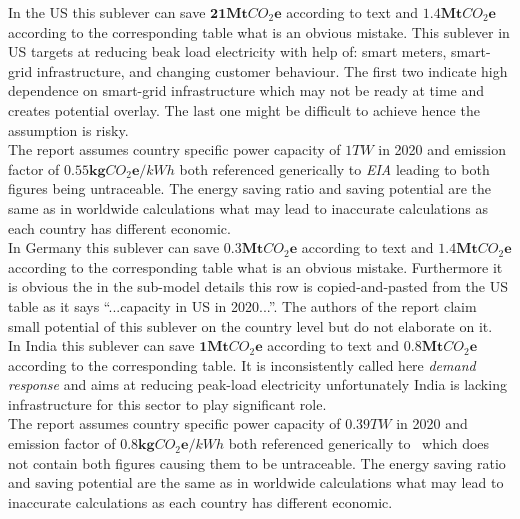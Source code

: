 \documentclass[11pt, twocolumn]{article}
\begin{document}
In the US this sublever can save $\mathbf{21} \mathbf{Mt}CO_2\mathbf{e}$ according to text and $\mathbf{1.4} \mathbf{Mt}CO_2\mathbf{e}$ according to the corresponding table what is an obvious mistake. This sublever in US targets at reducing beak load electricity with help of: smart meters, smart-grid infrastructure, and changing customer behaviour. The first two indicate high dependence on smart-grid infrastructure which may not be ready at time and creates potential overlay. The last one might be difficult to achieve hence the assumption is risky.\\
The report assumes country specific power capacity of $1 TW$ in 2020 and emission factor of $\mathbf{0.55} \mathbf{kg}CO_2\mathbf{e} / kWh$ both referenced generically to \emph{EIA} leading to both figures being untraceable. The energy saving ratio and saving potential are the same as in worldwide calculations what may lead to inaccurate calculations as each country has different economic.\\

In Germany this sublever can save $\mathbf{0.3} \mathbf{Mt}CO_2\mathbf{e}$ according to text and $\mathbf{1.4} \mathbf{Mt}CO_2\mathbf{e}$ according to the corresponding table what is an obvious mistake. Furthermore it is obvious the in the sub-model details this row is copied-and-pasted from the US table as it says ``...capacity in US in 2020...''. The authors of the report claim small potential of this sublever on the country level but do not elaborate on it.\\

In India this sublever can save $\mathbf{1} \mathbf{Mt}CO_2\mathbf{e}$ according to text and $\mathbf{0.8} \mathbf{Mt}CO_2\mathbf{e}$ according to the corresponding table. It is inconsistently called here \emph{demand response} and aims at reducing peak-load electricity unfortunately India is lacking infrastructure for this sector to play significant role.\\
The report assumes country specific power capacity of $0.39 TW$ in 2020 and emission factor of $\mathbf{0.8} \mathbf{kg}CO_2\mathbf{e} / kWh$ both referenced generically to~\citep{grid2008green} which does not contain both figures causing them to be untraceable. The energy saving ratio and saving potential are the same as in worldwide calculations what may lead to inaccurate calculations as each country has different economic.\\
\end{document}
